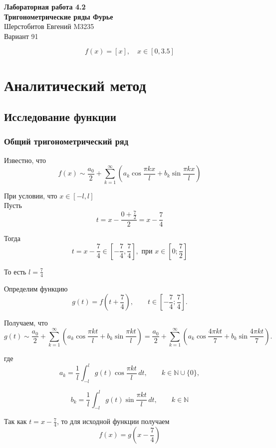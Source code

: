 \documentclass[12pt,a4paper]{article}
\begin{document}
\begin{center}
    {\Large \textbf{Лабораторная работа 4.2}}\\[0.3em]
    {\Large \textbf{Тригонометрические ряды Фурье}}\\[0.3em]
    {\large Шерстобитов Евгений M3235}\\[0.3em]
    {\large Вариант 91}
\end{center}

\[
f(x)=[x], \quad x\in [0,3.5]
\]

\section{Аналитический метод}

\subsection{Исследование функции}

\subsubsection*{Общий тригонометрический ряд}

Известно, что
\[
f(x)\sim
\frac{a_0}{2}
+
\sum_{k=1}^{\infty}
\left(
a_k\cos\frac{\pi kx}{l}
+
b_k\sin\frac{\pi kx}{l}
\right)
\]

При условии, что $x\in [-l,l]$ \\

Пусть
\[
t=x-\frac{0+\frac72}{2}=x-\frac74
\]

Тогда
\[
t=x-\frac74\in\left[-\frac74,\frac74\right], \text{ при } x\in\left[0;\frac72\right]
\]

То есть $l=\frac74$

Определим функцию
\[
g(t)=f\left(t+\frac74\right),
\qquad
t\in\left[-\frac74;\frac74\right].
\]

Получаем, что
\[
g(t)\sim
\frac{a_0}{2} + \sum_{k=1}^{\infty}
\left(a_k\cos\frac{\pi kt}{l} + b_k\sin\frac{\pi kt}{l}
\right)
=
\frac{a_0}{2} + \sum_{k=1}^{\infty}
\left(
a_k\cos\frac{4\pi kt}{7} + b_k\sin\frac{4\pi kt}{7}
\right).
\]

где
\[
a_k=
\frac1l
\int_{-l}^{l}
g(t)\cos\frac{\pi kt}{l}\,dt,
\qquad
k\in\mathbb N\cup\{0\},
\]

\[
b_k=
\frac1l
\int_{-l}^{l}
g(t)\sin\frac{\pi kt}{l}\,dt,
\qquad
k\in\mathbb N
\]

Так как $t=x-\frac74$, то для исходной функции получаем
\[
f(x)=g\left(x-\frac74\right)
\]
\end{document}
